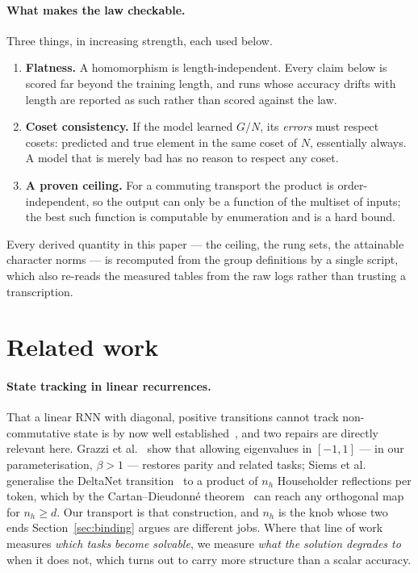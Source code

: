 \documentclass[10pt]{article}
\providecommand{\citep}{\cite}
\begin{document}
\paragraph{What makes the law checkable.} Three things, in increasing strength, each used below.
\begin{enumerate}[leftmargin=*,itemsep=2pt,topsep=3pt]
  \item \textbf{Flatness.} A homomorphism is length-independent. Every claim below is scored far
        beyond the training length, and runs whose accuracy drifts with length are reported as such
        rather than scored against the law.
  \item \textbf{Coset consistency.} If the model learned $G/N$, its \emph{errors} must respect
        cosets: predicted and true element in the same coset of $N$, essentially always. A model that
        is merely bad has no reason to respect any coset.
  \item \textbf{A proven ceiling.} For a commuting transport the product is order-independent, so the
        output can only be a function of the multiset of inputs; the best such function is computable
        by enumeration and is a hard bound.
\end{enumerate}

Every derived quantity in this paper --- the ceiling, the rung sets, the attainable character norms
--- is recomputed from the group definitions by a single script, which also re-reads the measured
tables from the raw logs rather than trusting a transcription.

\section{Related work}

\paragraph{State tracking in linear recurrences.} That a linear RNN with diagonal, positive
transitions cannot track non-commutative state is by now well
established~\citep{merrill2024,sarrof2024,deletang2023chomsky}, and two repairs are directly relevant
here. Grazzi et al.~\cite{grazzi2024} show that allowing eigenvalues in $[-1,1]$ --- in our parameterisation,
$\beta>1$ --- restores parity and related tasks; Siems et al.~\cite{siems2025} generalise the DeltaNet
transition~\citep{yang2024delta,yang2024gated} to a product of $n_h$ Householder reflections per
token, which by the Cartan--Dieudonn\'e theorem~\citep{artin1957} can reach any orthogonal map for
$n_h\ge d$. Our transport is that construction, and $n_h$ is the knob whose two ends
Section~\ref{sec:binding} argues are different jobs. Where that line of work measures \emph{which
tasks become solvable}, we measure \emph{what the solution degrades to} when it does not, which turns
out to carry more structure than a scalar accuracy.
\end{document}
